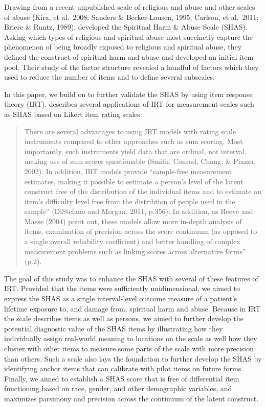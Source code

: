 \documentclass[
]{article}
\begin{document}
Drawing from a recent unpublished scale of religious and abuse \citep{Keller2016} and other scales of abuse (Kira, et al.~2008; Sanders \& Becker-Lausen, 1995; Carlson, et al.~2011; Briere \& Runtz, 1989), \citet{KochEdstrom2022} developed the Spiritual Harm \& Abuse Scale (SHAS). Asking which types of religious and spiritual abuse most succinctly capture the phenomenon of being broadly exposed to religious and spiritual abuse, they defined the construct of spiritual harm and abuse and developed an initial item pool. Their study of the factor structure revealed a handful of factors which they used to reduce the number of items and to define several subscales.

In this paper, we build on \citet{KochEdstrom2022} to further validate the SHAS by using item response theory (IRT). \citet{Dogan2018} describes several applications of IRT for measurement scales such as SHAS based on Likert item rating scales:

\begin{quote}
There are several advantages to using IRT models with rating scale instruments compared to other approaches such as sum scoring. Most importantly, such instruments yield data that are ordinal, not interval, making use of sum scores questionable (Smith, Conrad, Chang, \& Piazza, 2002). In addition, IRT models provide ``sample-free measurement estimates, making it possible to estimate a person's level of the latent construct free of the distribution of the individual items and to estimate an item's difficulty level free from the distribtion of people used in the sample'' (DiStefano and Morgan, 2011, p.356). In addition, as Reeve and Masse (2004) point out, these models allow more in-depth analysis of items, examination of precision across the score continuum (as opposed to a single overall reliability coefficient) and better handling of complex measurement problems such as linking scores across alternative forms'' (p.2).
\end{quote}

The goal of this study was to enhance the SHAS with several of these features of IRT. Provided that the items were sufficiently unidimensional, we aimed to express the SHAS as a single interval-level outcome measure of a patient's lifetime exposure to, and damage from, spiritual harm and abuse. Because in IRT the scale describes items as well as persons, we aimed to further develop the potential diagnostic value of the SHAS items by illustrating how they individually assign real-world meaning to locations on the scale as well how they cluster with other items to measure some parts of the scale with more precision than others. Such a scale also lays the foundation to further develop the SHAS by identifying anchor items that can calibrate with pilot items on future forms. Finally, we aimed to establish a SHAS score that is free of differential item functioning based on race, gender, and other demographic variables, and maximizes parsimony and precision across the continuum of the latent construct.
\end{document}
